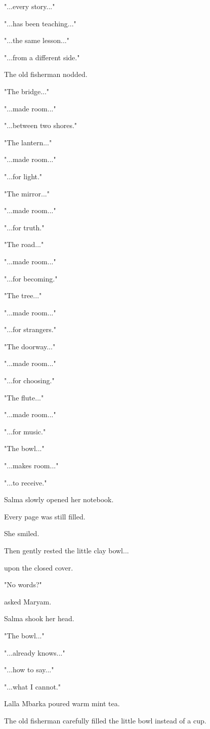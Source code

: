 \documentclass[12pt,openany]{book}
\begin{document}
"...every story..."

"...has been teaching..."

"...the same lesson..."

"...from a different side."

The old fisherman nodded.

"The bridge..."

"...made room..."

"...between two shores."

"The lantern..."

"...made room..."

"...for light."

"The mirror..."

"...made room..."

"...for truth."

"The road..."

"...made room..."

"...for becoming."

"The tree..."

"...made room..."

"...for strangers."

"The doorway..."

"...made room..."

"...for choosing."

"The flute..."

"...made room..."

"...for music."

"The bowl..."

"...makes room..."

"...to receive."

Salma slowly opened her notebook.

Every page was still filled.

She smiled.

Then gently rested the little clay bowl...

upon the closed cover.

"No words?"

asked Maryam.

Salma shook her head.

"The bowl..."

"...already knows..."

"...how to say..."

"...what I cannot."

Lalla Mbarka poured warm mint tea.

The old fisherman carefully filled the little bowl instead of a cup.
\end{document}
